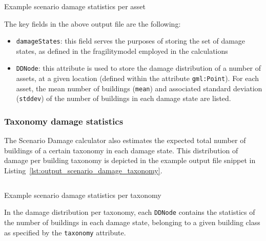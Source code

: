\begin{listing}[htbp]
  \inputminted[firstline=1,firstnumber=1,fontsize=\footnotesize,frame=single,bgcolor=lightgray]{xml}{oqum/risk/verbatim/output_scenario_damage_asset.xml}
  \caption{Example scenario damage statistics per asset}
  \label{lst:output_scenario_damage_asset}
\end{listing}

The key fields in the above output file are the following:

\begin{itemize}

  \item \Verb+damageStates+: this field serves the purposes of storing the set
    of damage states, as defined in the \gls{fragilitymodel} employed in the
    calculations

  \item \Verb+DDNode+: this attribute is used to store the damage distribution
    of a number of \glspl{asset}, at a given location (defined within the
    attribute \Verb+gml:Point+). For each \gls{asset}, the mean number of
    buildings (\Verb+mean+) and associated standard deviation (\Verb+stddev+)
    of the number of buildings in each damage state are listed.

\end{itemize}


\subsubsection{Taxonomy damage statistics}
\label{subsubsec:scenario_taxonomy_damage_statistics}

The Scenario Damage calculator also estimates the expected total number of
buildings of a certain \gls{taxonomy} in each damage state. This distribution
of damage per building \gls{taxonomy} is depicted in the example
output file snippet in Listing~\ref{lst:output_scenario_damage_taxonomy}.

\begin{listing}[htbp]
  \inputminted[firstline=1,firstnumber=1,fontsize=\footnotesize,frame=single,linenos,bgcolor=lightgray]{xml}{oqum/risk/verbatim/output_scenario_damage_taxonomy.xml}
  \caption{Example scenario damage statistics per taxonomy}
  \label{lst:output_scenario_damage_taxonomy}
\end{listing}

In the damage distribution per \gls{taxonomy}, each \Verb+DDNode+ contains the
statistics of the number of buildings in each damage state, belonging to a
given building class as specified by the \Verb+taxonomy+ attribute.


